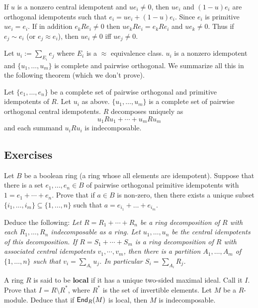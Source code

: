 If $u$ is a nonzero central idempotent and $ue_i \neq 0$, then $ue_i$ and $(1-u)e_i$ are orthogonal idempotents such that $e_i=ue_i+(1-u)e_i$. 
Since $e_i$ is primitive $ue_i=e_i$. 
If in addition $e_k R e_i \neq 0$ then $ue_k R e_i=e_k R e_i$ and $ue_k \neq 0$. 
Thus if $e_j \sim e_i$ (or $e_j \approx e_i$), then $ue_i \neq 0$ iff $ue_j \neq 0$. 

Let $u_i :=\sum_{E_i} e_j$ where $E_i$ is a $\approx$ equivalence class. $u_i$ is a nonzero idempotent and $\{u_1, \ldots, u_m\}$ is complete and pairwise orthogonal. 
We summarize all this in the following theorem (which we don't prove). 

\begin{thm}
Let $\{e_1, \ldots, e_n\}$ be a complete set of pairwise orthogonal and primitive idempotents of $R$.
Let $u_i$ as above. 
$\{u_1, \ldots, u_m\}$ is a complete set of pairwise orthogonal central idempotents. 
$R$ decomposes uniquely as 
$$u_1 R u_1 + \cdots + u_m R u_m$$
and each summand $u_iRu_i$ is indecomposable. 

\end{thm}

\subsection*{Exercises}
\begin{ex}
\label{boolean}
Let $B$ be a boolean ring (a ring whose all elements are idempotent).
Suppose that there is a set $e_1, \ldots , e_n \in B$ of pairwise orthogonal primitive idempotents with $1= e_1 + \cdots +e_n$. 
Prove that if $a \in B$ is non-zero, then there exists a unique subset $\{i_1,\ldots,i_m\} \subseteq \{1,\ldots,n\}$ such that $a= e_{i_1} +\ldots+e_{i_m}$.

Deduce the following: 
\textit{Let $R = R_1 + \cdots +R_n$ be a ring decomposition of $R$ with each $R_1,\ldots ,R_n$ indecomposable as a ring.
Let $u_1, \ldots, u_n$ be the central idempotents of this decomposition. 
If $R = S_1 +\cdots + S_m$ is a ring decomposition of $R$ with associated central idempotents $v_1 ,\cdots, v_m$, then there is a partition $A_1,\ldots, A_m$ of $\{1,\ldots,n\}$ such that $v_i = \sum_{A_i} u_j$. 
In particular $S_i = \sum_{A_i} R_j$.}


\end{ex}

\begin{ex}
A ring $R$ is said to be $\textbf{local}$ if it has a unique two-sided maximal ideal. 
Call it $I$. 
Prove that $I=R\setminus R^{\ast}$, where $R^{\ast}$ is the set of invertible elements. 
Let $M$ be a $R$-module. 
Deduce that if $\operatorname{\sf{End}}_R(M)$ is local, then $M$ is indecomposable.
\end{ex}
